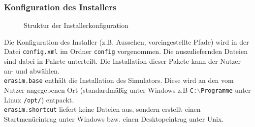 \subsubsection{Konfiguration des Installers}
\begin{figure}[H]
	\begin{center}
	\end{center}
	
	\caption{Struktur der Installerkonfiguration}
	\label{dev-manual-installer}
\end{figure}
Die Konfiguration des Installer (z.B. Aussehen, voreingestellte Pfade) wird in der Datei \texttt{config.xml} im Ordner \texttt{config} vorgenommen. Die auszuliefernden Dateien sind dabei in Pakete unterteilt. Die Installation dieser Pakete kann der Nutzer an- und abwählen.\\
\texttt{erasim.base} enthält die Installation des Simulators. Diese wird an den vom Nutzer angegebenen Ort (standardmäßig unter Windows z.B \texttt{C:$\backslash$Programme} unter Linux \texttt{/opt/}) entpackt.\\
\texttt{erasim.shortcut} liefert keine Dateien aus, sondern erstellt einen Startmenüeintrag unter Windows bzw. einen Desktopeintrag unter Unix.

